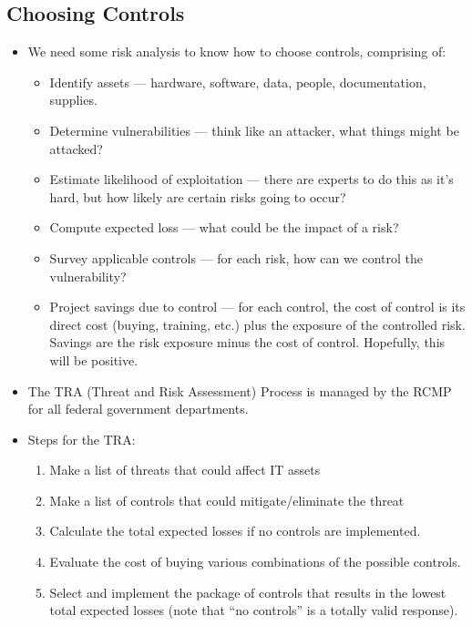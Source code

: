 \documentclass{article}
\begin{document}
\subsection{Choosing Controls}
\begin{itemize}
    \item We need some risk analysis to know how to choose controls, comprising of:
        \begin{itemize}
            \item Identify assets --- hardware, software, data, people, documentation, supplies.
            \item Determine vulnerabilities --- think like an attacker, what things might be attacked?
            \item Estimate likelihood of exploitation --- there are experts to do this as it's hard, but how likely are certain risks going to occur?
            \item Compute expected loss --- what could be the impact of a risk?
            \item Survey applicable controls --- for each risk, how can we control the vulnerability?
            \item Project savings due to control --- for each control, the cost of control is its direct cost (buying, training, etc.) plus the exposure of the controlled risk.  Savings are the risk exposure minus the cost of control.  Hopefully, this will be positive.
        \end{itemize}
    \item The TRA (Threat and Risk Assessment) Process is managed by the RCMP for all federal government departments.
    \item Steps for the TRA:
        \begin{enumerate}
            \item Make a list of threats that could affect IT assets
            \item Make a list of controls that could mitigate/eliminate the threat
            \item Calculate the total expected losses if no controls are implemented.
            \item Evaluate the cost of buying various combinations of the possible controls.
            \item Select and implement the package of controls that results in the lowest total expected losses (note that ``no controls'' is a totally valid response).
        \end{enumerate}
\end{itemize}
\end{document}
